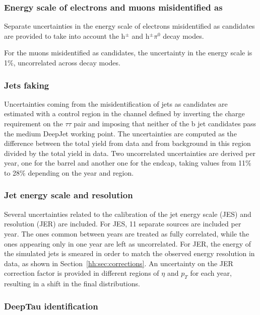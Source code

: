 \documentclass[../main.tex]{subfiles}
\begin{document}
\subsubsection*{Energy scale of electrons and muons misidentified as \tauh{}}

Separate uncertainties in the energy scale of electrons misidentified as \tauh{} candidates are provided to take into account the h${}^\pm$ and h${}^\pm\pi^0$ decay modes.

For the muons misidentified as \tauh{} candidates, the uncertainty in the energy scale is 1\%, uncorrelated across decay modes.

\subsubsection*{Jets faking \tauh}

Uncertainties coming from the misidentification of jets as \tauh{} candidates are estimated with a control region in the \taumu\tauh{} channel defined by inverting the charge requirement on the $\tau\tau$ pair and imposing that neither of the b jet candidates pass the medium DeepJet working point. The uncertainties are computed as the difference between the total yield from data and from background in this region divided by the total yield in data. Two uncorrelated uncertainties are derived per year, one for the barrel and another one for the endcap, taking values from 11\% to 28\% depending on the year and region.

\subsubsection*{Jet energy scale and resolution}

Several uncertainties related to the calibration of the jet energy scale (JES) and resolution (JER) are included. For JES, 11 separate sources are included per year. The ones common between years are treated as fully correlated, while the ones appearing only in one year are left as uncorrelated. For JER, the energy of the simulated jets is smeared in order to match the observed energy resolution in data, as shown in Section~\ref{hh:sec:corrections}. An uncertainty on the JER correction factor is provided in different regions of $\eta$ and $p_T$ for each year, resulting in a shift in the final distributions.


\subsubsection*{DeepTau identification}
\end{document}
